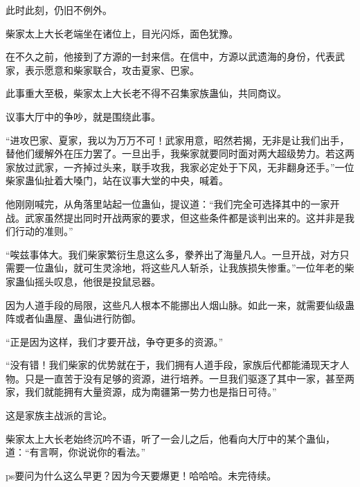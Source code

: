 \begin{this_body}
此时此刻，仍旧不例外。

柴家太上大长老端坐在诸位上，目光闪烁，面色犹豫。

在不久之前，他接到了方源的一封来信。在信中，方源以武遗海的身份，代表武家，表示愿意和柴家联合，攻击夏家、巴家。

此事重大至极，柴家太上大长老不得不召集家族蛊仙，共同商议。

议事大厅中的争吵，就是围绕此事。

“进攻巴家、夏家，我以为万万不可！武家用意，昭然若揭，无非是让我们出手，替他们缓解外在压力罢了。一旦出手，我柴家就要同时面对两大超级势力。若这两家放过武家，一齐掉过头来，联手攻我，我家必定处于下风，无非翻身还手。”一位柴家蛊仙扯着大嗓门，站在议事大堂的中央，喊着。

他刚刚喊完，从角落里站起一位蛊仙，提议道：“我们完全可选择其中的一家开战。武家虽然提出同时开战两家的要求，但这些条件都是谈判出来的。这并非是我们行动的准则。”

“唉兹事体大。我们柴家繁衍生息这么多，豢养出了海量凡人。一旦开战，对方只需要一位蛊仙，就可生灵涂地，将这些凡人斩杀，让我族损失惨重。”一位年老的柴家蛊仙摇头叹息，他很是投鼠忌器。

因为人道手段的局限，这些凡人根本不能挪出人烟山脉。如此一来，就需要仙级蛊阵或者仙蛊屋、蛊仙进行防御。

“正是因为这样，我们才要开战，争夺更多的资源。”

“没有错！我们柴家的优势就在于，我们拥有人道手段，家族后代都能涌现天才人物。只是一直苦于没有足够的资源，进行培养。一旦我们驱逐了其中一家，甚至两家，我们就能拥有大量资源，成为南疆第一势力也是指日可待。”

这是家族主战派的言论。

柴家太上大长老始终沉吟不语，听了一会儿之后，他看向大厅中的某个蛊仙，道：“有言啊，你说说你的看法。”

ps要问为什么这么早更？因为今天要爆更！哈哈哈。未完待续。

\end{this_body}

